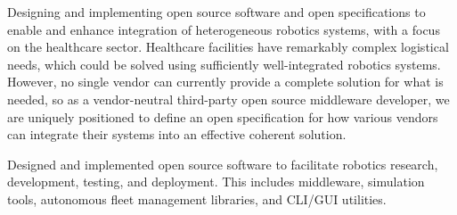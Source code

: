 \documentclass[10pt,a4paper,ragged2e]{altacv}
\begin{document}

\begin{fullwidth}
\makecvheader
\end{fullwidth}



Designing and implementing open source software and open specifications to enable and enhance integration of heterogeneous robotics systems, with a focus on the healthcare sector. Healthcare facilities have remarkably complex logistical needs, which could be solved using sufficiently well-integrated robotics systems. However, no single vendor can currently provide a complete solution for what is needed, so as a vendor-neutral third-party open source middleware developer, we are uniquely positioned to define an open specification for how various vendors can integrate their systems into an effective coherent solution. 

\divider

Designed and implemented open source software to facilitate robotics research, development, testing, and deployment. This includes middleware, simulation tools, autonomous fleet management libraries, and CLI/GUI utilities.

\divider
\end{document}
